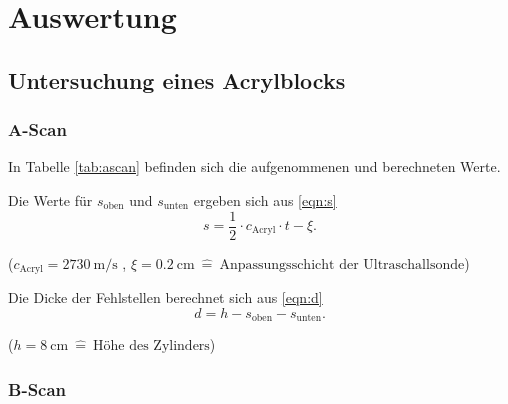 \section{Auswertung}

\subsection{Untersuchung eines Acrylblocks \label{sec:acryl}}

\subsubsection{A-Scan \label{sec:ascan}}

In Tabelle \ref{tab:ascan} befinden sich die aufgenommenen und berechneten Werte.


Die Werte für $s_\text{oben}$ und $s_\text{unten}$ ergeben sich aus \eqref{eqn:s}
\begin{equation}
  s = \frac{1}{2} \cdot c_\text{Acryl} \cdot t - \xi.
  \label{eqn:s}
\end{equation}
\begin{center}
 \tiny{($c_\text{Acryl} = \SI{2730}{\m \per \s}$ \cite{sample2}, $\xi = \SI{0,2}{\cm} \: \hat{=} \: \text{Anpassungsschicht der Ultraschallsonde}$)}
\end{center}

Die Dicke der Fehlstellen berechnet sich aus \eqref{eqn:d}
\begin{equation}
  d = h - s_\text{oben} - s_\text{unten}.
  \label{eqn:d}
\end{equation}
\begin{center}
 \tiny{($h = \SI{8}{\cm} \: \hat{=} \: \text{Höhe des Zylinders}$)}
\end{center}

\subsubsection{B-Scan \label{sec:bscan}}

